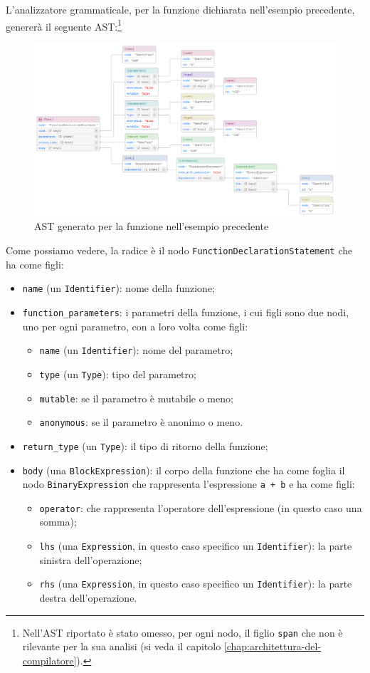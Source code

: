 L'analizzatore grammaticale, per la funzione dichiarata nell'esempio precedente, generer\`a il seguente AST:\footnote{Nell'AST riportato \`e stato omesso, per ogni nodo, il figlio \texttt{span} che non \`e rilevante per la sua analisi (si veda il capitolo \ref{chap:architettura-del-compilatore}).}
\begin{figure}[H]
	\centering
	\includegraphics[width=\textwidth]{figures/function_declaration_ast.png}
	\caption{AST generato per la funzione nell'esempio precedente}
	\label{fig:bugginout-example-function-declaration-ast}
\end{figure}
Come possiamo vedere, la radice \`e il nodo \texttt{FunctionDeclarationStatement} che ha come figli:
\begin{itemize}
	\item \texttt{name} (un \texttt{Identifier}): nome della funzione;
	\item \texttt{function\_parameters}: i parametri della funzione, i cui figli sono due nodi, uno per ogni parametro, con a loro volta come figli:
	\begin{itemize}
		\item \texttt{name} (un \texttt{Identifier}): nome del parametro;
		\item \texttt{type} (un \texttt{Type}): tipo del parametro;
		\item \texttt{mutable}: se il parametro \`e mutabile o meno;
		\item \texttt{anonymous}: se il parametro \`e anonimo o meno.
	\end{itemize}
	\item \texttt{return\_type} (un \texttt{Type}): il tipo di ritorno della funzione;
	\item \texttt{body} (una \texttt{BlockExpression}): il corpo della funzione che ha come foglia il nodo \texttt{BinaryExpression} che rappresenta l'espressione \texttt{a + b} e ha come figli:
	\begin{itemize}
		\item \texttt{operator}: che rappresenta l'operatore dell'espressione (in questo caso una somma);
		\item \texttt{lhs} (una \texttt{Expression}, in questo caso specifico un \texttt{Identifier}): la parte sinistra dell'operazione;
		\item \texttt{rhs} (una \texttt{Expression}, in questo caso specifico un \texttt{Identifier}): la parte destra dell'operazione.
	\end{itemize}
\end{itemize}

